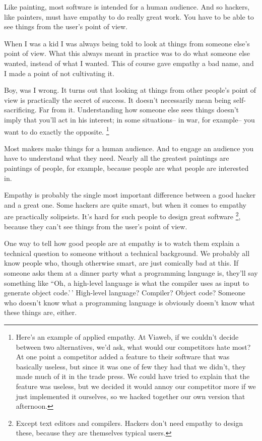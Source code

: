 Like painting, most software is intended for a human audience. And so
hackers, like painters, must have empathy to do really great work. You
have to be able to see things from the user's point of view.

When I was a kid I was always being told to look at things from someone
else's point of view. What this always meant in practice was to do what
someone else wanted, instead of what I wanted. This of course gave
empathy a bad name, and I made a point of not cultivating it.

Boy, was I wrong. It turns out that looking at things from other
people's point of view is practically the secret of success. It doesn't
necessarily mean being self-sacrificing. Far from it. Understanding how
someone else sees things doesn't imply that you'll act in his interest;
in some situations-- in war, for example-- you want to do exactly the
opposite. \footnote{Here's an example of applied empathy. At Viaweb, if we couldn't
decide between two alternatives, we'd ask, what would our competitors
hate most? At one point a competitor added a feature to their software
that was basically useless, but since it was one of few they had that we
didn't, they made much of it in the trade press. We could have tried to
explain that the feature was useless, but we decided it would annoy our
competitor more if we just implemented it ourselves, so we hacked
together our own version that afternoon.}

Most makers make things for a human audience. And to engage an audience
you have to understand what they need. Nearly all the greatest paintings
are paintings of people, for example, because people are what people are
interested in.

Empathy is probably the single most important difference between a good
hacker and a great one. Some hackers are quite smart, but when it comes
to empathy are practically solipsists. It's hard for such people to
design great software \footnote{Except text editors and compilers. Hackers don't need empathy to
design these, because they are themselves typical users.}, because they can't see things from the
user's point of view.

One way to tell how good people are at empathy is to watch them explain
a technical question to someone without a technical background. We
probably all know people who, though otherwise smart, are just comically
bad at this. If someone asks them at a dinner party what a programming
language is, they'll say something like ``Oh, a high-level language is
what the compiler uses as input to generate object code.'\,' High-level
language? Compiler? Object code? Someone who doesn't know what a
programming language is obviously doesn't know what these things are,
either.


